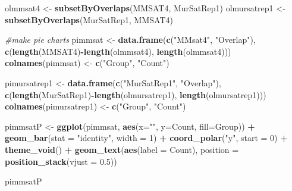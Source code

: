 \documentclass[
]{article}
\newenvironment{Shaded}{\begin{snugshade}}{\end{snugshade}}
\newcommand{\AttributeTok}[1]{\textcolor[rgb]{0.13,0.29,0.53}{#1}}
\newcommand{\CommentTok}[1]{\textcolor[rgb]{0.56,0.35,0.01}{\textit{#1}}}
\newcommand{\DecValTok}[1]{\textcolor[rgb]{0.00,0.00,0.81}{#1}}
\newcommand{\FloatTok}[1]{\textcolor[rgb]{0.00,0.00,0.81}{#1}}
\newcommand{\FunctionTok}[1]{\textcolor[rgb]{0.13,0.29,0.53}{\textbf{#1}}}
\newcommand{\NormalTok}[1]{#1}
\newcommand{\OtherTok}[1]{\textcolor[rgb]{0.56,0.35,0.01}{#1}}
\newcommand{\SpecialCharTok}[1]{\textcolor[rgb]{0.81,0.36,0.00}{\textbf{#1}}}
\newcommand{\StringTok}[1]{\textcolor[rgb]{0.31,0.60,0.02}{#1}}
\begin{document}
\begin{Shaded}
\begin{Highlighting}[]
\NormalTok{olmmsat4 }\OtherTok{\textless{}{-}} \FunctionTok{subsetByOverlaps}\NormalTok{(MMSAT4, MurSatRep1)}
\NormalTok{olmursatrep1 }\OtherTok{\textless{}{-}} \FunctionTok{subsetByOverlaps}\NormalTok{(MurSatRep1, MMSAT4)}


\CommentTok{\#make pie charts}
\NormalTok{pimmsat }\OtherTok{\textless{}{-}} \FunctionTok{data.frame}\NormalTok{(}\FunctionTok{c}\NormalTok{(}\StringTok{"MMsat4"}\NormalTok{, }\StringTok{"Overlap"}\NormalTok{),}
                      \FunctionTok{c}\NormalTok{(}\FunctionTok{length}\NormalTok{(MMSAT4)}\SpecialCharTok{{-}}\FunctionTok{length}\NormalTok{(olmmsat4), }\FunctionTok{length}\NormalTok{(olmmsat4)))}
\FunctionTok{colnames}\NormalTok{(pimmsat) }\OtherTok{\textless{}{-}} \FunctionTok{c}\NormalTok{(}\StringTok{"Group"}\NormalTok{, }\StringTok{"Count"}\NormalTok{)}

\NormalTok{pimursatrep1 }\OtherTok{\textless{}{-}} \FunctionTok{data.frame}\NormalTok{(}\FunctionTok{c}\NormalTok{(}\StringTok{"MurSatRep1"}\NormalTok{, }\StringTok{"Overlap"}\NormalTok{),}
                      \FunctionTok{c}\NormalTok{(}\FunctionTok{length}\NormalTok{(MurSatRep1)}\SpecialCharTok{{-}}\FunctionTok{length}\NormalTok{(olmursatrep1), }\FunctionTok{length}\NormalTok{(olmursatrep1)))}
\FunctionTok{colnames}\NormalTok{(pimursatrep1) }\OtherTok{\textless{}{-}} \FunctionTok{c}\NormalTok{(}\StringTok{"Group"}\NormalTok{, }\StringTok{"Count"}\NormalTok{)}

\NormalTok{pimmsatP }\OtherTok{\textless{}{-}} \FunctionTok{ggplot}\NormalTok{(pimmsat, }\FunctionTok{aes}\NormalTok{(}\AttributeTok{x=}\StringTok{""}\NormalTok{, }\AttributeTok{y=}\NormalTok{Count, }\AttributeTok{fill=}\NormalTok{Group)) }\SpecialCharTok{+} 
  \FunctionTok{geom\_bar}\NormalTok{(}\AttributeTok{stat =} \StringTok{"identity"}\NormalTok{, }\AttributeTok{width =} \DecValTok{1}\NormalTok{) }\SpecialCharTok{+}
  \FunctionTok{coord\_polar}\NormalTok{(}\StringTok{"y"}\NormalTok{, }\AttributeTok{start =} \DecValTok{0}\NormalTok{) }\SpecialCharTok{+}
  \FunctionTok{theme\_void}\NormalTok{() }\SpecialCharTok{+}
  \FunctionTok{geom\_text}\NormalTok{(}\FunctionTok{aes}\NormalTok{(}\AttributeTok{label =}\NormalTok{ Count),}
            \AttributeTok{position =} \FunctionTok{position\_stack}\NormalTok{(}\AttributeTok{vjust =} \FloatTok{0.5}\NormalTok{)) }

\NormalTok{pimmsatP}
\end{Highlighting}
\end{Shaded}
\end{document}
